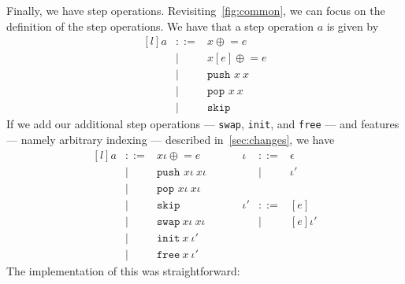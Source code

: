 Finally, we have step operations. Revisiting~\ref{fig:common}, we can focus on the definition of the step operations. We have that a step operation $a$ is given by
\[
\begin{matrix*}[l]
  {a} & ::= & {x}\mathrel{\oplus}= e \\
             &  |  & {x}[ e]\mathrel{\oplus}= e \\
             &  |  & \texttt{push }{x}\ {x} \\
             &  |  & \texttt{pop  }{x}\ {x} \\
             &  |  & \texttt{skip}
\end{matrix*}
\]
If we add our additional step operations --- \texttt{swap}, \texttt{init}, and \texttt{free} --- and features --- namely arbitrary indexing --- described in~\ref{sec:changes}, we have
\[
\begin{matrix*}[l]
  {a} & ::= & {x}\iota\mathrel{\oplus}= e       \quad\quad\quad  & \iota  & ::= & \epsilon \\
      &  |  & \texttt{push }{x}\iota \ {x}\iota                   &        & |   & \iota' \\
      &  |  & \texttt{pop  }{x}\iota \ {x}\iota \\
      &  |  & \texttt{skip}                                      & \iota' & ::= & [e] \\
      &  |  & \texttt{swap} \ x\iota \ x\iota                    &        & |   & [e]\iota' \\
      &  |  & \texttt{init} \ x \ \iota' \\
      &  |  & \texttt{free} \ x \ \iota'
\end{matrix*}
\]
The implementation of this was straightforward:


